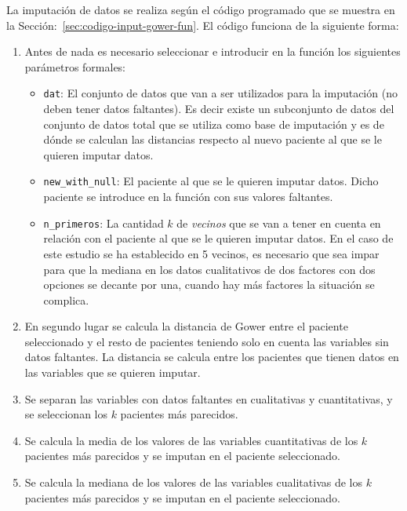 La imputación de datos se realiza según el código programado que se muestra en la Sección:~\ref{sec:codigo-input-gower-fun}. El código funciona de la siguiente forma: 
\begin{enumerate}
    \item Antes de nada es necesario seleccionar e introducir en la función los siguientes parámetros formales: 
    \begin{itemize}
        \item \texttt{dat}: El conjunto de datos que van a ser utilizados para la imputación (no deben tener datos faltantes). Es decir existe un subconjunto de datos del conjunto de datos total que se utiliza como base de imputación y es de dónde se calculan las distancias respecto al nuevo paciente al que se le quieren imputar datos.
        \item \texttt{new\_with\_null}: El paciente al que se le quieren imputar datos. Dicho paciente se introduce en la función con sus valores faltantes.
        \item \texttt{n\_primeros}: La cantidad $k$ de \textit{vecinos} que se van a tener en cuenta en relación con el paciente al que se le quieren imputar datos. En el caso de este estudio se ha establecido en 5 vecinos, es necesario que sea impar para que la mediana en los datos cualitativos de dos factores con dos opciones se decante por una, cuando hay más factores la situación se complica. 
    \end{itemize}
    \item En segundo lugar se calcula la distancia de Gower entre el paciente seleccionado y el resto de pacientes teniendo solo en cuenta las variables sin datos faltantes. La distancia se calcula entre los pacientes que tienen datos en las variables que se quieren imputar.
    \item Se separan las variables con datos faltantes en cualitativas y cuantitativas, y se seleccionan los $k$ pacientes más parecidos.
    \item Se calcula la media de los valores de las variables cuantitativas de los $k$ pacientes más parecidos y se imputan en el paciente seleccionado.
    \item Se calcula la mediana de los valores de las variables cualitativas de los $k$ pacientes más parecidos y se imputan en el paciente seleccionado.
\end{enumerate}

